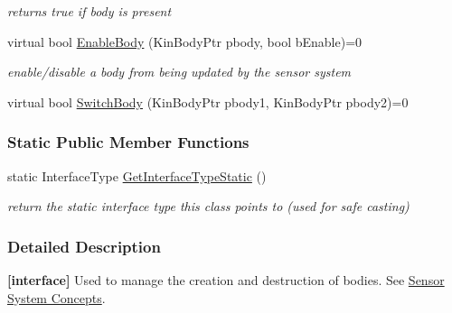 \begin{DoxyCompactItemize}
\begin{DoxyCompactList}\small\item\em returns true if body is present \item\end{DoxyCompactList}\item 
\hypertarget{classOpenRAVE_1_1SensorSystemBase_af12324167a3e2d2d82f97d7c6376645d}{
virtual bool \hyperlink{classOpenRAVE_1_1SensorSystemBase_af12324167a3e2d2d82f97d7c6376645d}{EnableBody} (KinBodyPtr pbody, bool bEnable)=0}
\label{classOpenRAVE_1_1SensorSystemBase_af12324167a3e2d2d82f97d7c6376645d}

\begin{DoxyCompactList}\small\item\em enable/disable a body from being updated by the sensor system \item\end{DoxyCompactList}\item 
virtual bool \hyperlink{classOpenRAVE_1_1SensorSystemBase_afbf8616af8f2414b866e5ce416072af4}{SwitchBody} (KinBodyPtr pbody1, KinBodyPtr pbody2)=0
\end{DoxyCompactItemize}
\subsubsection*{Static Public Member Functions}
\begin{DoxyCompactItemize}
\item 
\hypertarget{classOpenRAVE_1_1SensorSystemBase_affeafe65e7c4094f282d273dedbf069b}{
static InterfaceType \hyperlink{classOpenRAVE_1_1SensorSystemBase_affeafe65e7c4094f282d273dedbf069b}{GetInterfaceTypeStatic} ()}
\label{classOpenRAVE_1_1SensorSystemBase_affeafe65e7c4094f282d273dedbf069b}

\begin{DoxyCompactList}\small\item\em return the static interface type this class points to (used for safe casting) \item\end{DoxyCompactList}\end{DoxyCompactItemize}


\subsubsection{Detailed Description}
{\bfseries \mbox{[}interface\mbox{]}} Used to manage the creation and destruction of bodies. See \hyperlink{arch__sensorsystem}{Sensor System Concepts}. 

